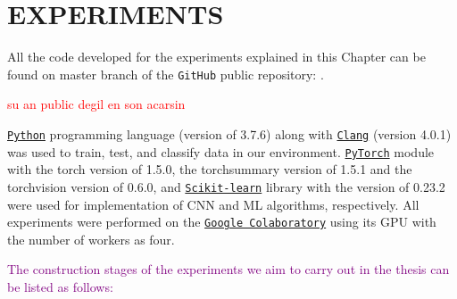 \chapter{EXPERIMENTS}
\label{ch:CH5}

All the code developed for the experiments explained in this Chapter can be found on master branch of the \verb|GitHub| public repository: \newline
\textcolor{blue}{}.

\textcolor{red}{su an public degil en son acarsin}

\href{https://www.python.org/downloads/release/python-376/}{\texttt{Python}} programming language (version of 3.7.6) along with \href{https://releases.llvm.org/4.0.1/}{\texttt{Clang}} (version 4.0.1) was used to train, test, and classify data in our environment. \href{https://pytorch.org/get-started/previous-versions/#v150}{\texttt{PyTorch}} module with the torch version of 1.5.0, the torchsummary version of 1.5.1 and the torchvision version of 0.6.0, and \href{https://scikit-learn.org/stable/whats_new/v0.23.html}{\texttt{Scikit-learn}} library with the version of 0.23.2 were used for implementation of CNN and ML algorithms, respectively. All experiments were performed on the \href{https://colab.research.google.com/}{\texttt{Google Colaboratory}} using its GPU with the number of workers as four.

\textcolor{purple}{The construction stages of the experiments we aim to carry out in the thesis can be listed as follows:}

